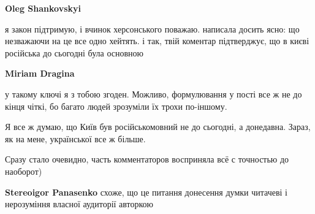 \begin{itemize}
\begin{itemize}
 
\textbf{Oleg Shankovskyi} 

я закон підтримую, і вчинок херсонського поважаю. написала досить ясно: що
незважаючи на це все одно хейтять. і так, твій коментар підтверджує, що в києві
російська до сьогодні була основною

 
\textbf{Miriam Dragina} 

у такому ключі я з тобою згоден. Можливо, формулювання у пості все ж не до
кінця чіткі, бо багато людей зрозуміли їх трохи по-іншому.

Я все ж думаю, що Київ був російськомовний не до сьогодні, а донедавна. Зараз,
як на мене, української все ж більше.

\end{itemize}

 

Сразу стало очевидно, часть комментаторов восприняла всё с точностью до
наоборот)

\begin{itemize}
 
\textbf{Stereoigor Panasenko} схоже, що це питання донесення думки читачеві і нерозуміння власної аудиторії авторкою

 

\end{itemize}
\end{itemize}
